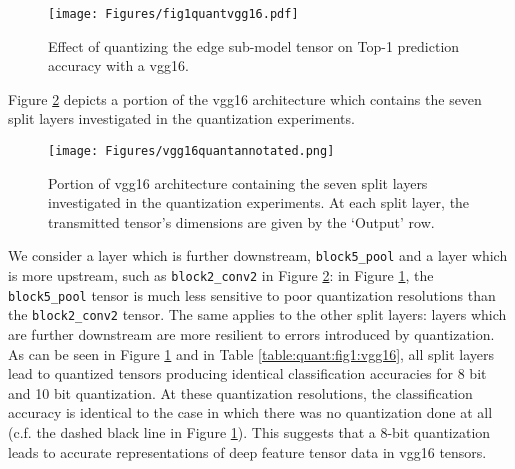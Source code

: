 \begin{figure}[H]
	\centering
	\texttt{[image: Figures/fig1quantvgg16.pdf]}
	\caption[Effect of quantizing the edge sub-model tensor on Top-1 prediction accuracy with a VGG16]{Effect of quantizing the edge sub-model tensor on Top-1 prediction accuracy with a \gls{vgg16}.} \label{fig:expts:quant:vgg16}
\end{figure}
Figure \ref{fig:expts:quant:vgg16:arch} depicts a portion of the \gls{vgg16} architecture which contains the seven split layers investigated in the quantization experiments.
\begin{figure}[H]
	\centering
	\texttt{[image: Figures/vgg16quantannotated.png]}
	\caption[VGG16 architecture]{Portion of \gls{vgg16} architecture containing the seven split layers investigated in the quantization experiments. At each split layer, the transmitted tensor's dimensions are given by the `Output' row.}
	\label{fig:expts:quant:vgg16:arch}
\end{figure}

We consider a layer which is further downstream, \verb|block5_pool| and a layer which is more upstream, such as \verb|block2_conv2| in Figure \ref{fig:expts:quant:vgg16:arch}: in Figure \ref{fig:expts:quant:vgg16}, the \verb|block5_pool| tensor is much less sensitive to poor quantization resolutions than the \verb|block2_conv2| tensor. The same applies to the other split layers: layers which are further downstream are more resilient to errors introduced by quantization. As can be seen in Figure \ref{fig:expts:quant:vgg16} and in Table \ref{table:quant:fig1:vgg16}, all split layers lead to quantized tensors producing identical classification accuracies for 8 bit and 10 bit quantization. At these quantization resolutions, the classification accuracy is identical to the case in which there was no quantization done at all (c.f. the dashed black line in Figure \ref{fig:expts:quant:vgg16}). This suggests that a 8-bit quantization leads to accurate representations of deep feature tensor data in \gls{vgg16} tensors.

